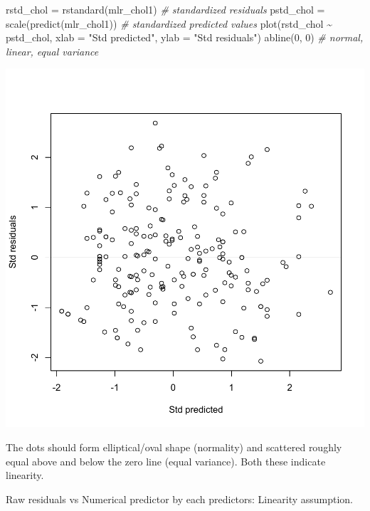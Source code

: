 \documentclass[
]{book}
\makeatletter
\newenvironment{Shaded}{\begin{snugshade}}{\end{snugshade}}
\newcommand{\AttributeTok}[1]{\textcolor[rgb]{0.61,0.61,0.61}{#1}}
\newcommand{\CommentTok}[1]{\textcolor[rgb]{0.37,0.37,0.37}{\textit{#1}}}
\newcommand{\DecValTok}[1]{\textcolor[rgb]{0.06,0.06,0.06}{#1}}
\newcommand{\FunctionTok}[1]{\textcolor[rgb]{0,0,0}{#1}}
\newcommand{\NormalTok}[1]{#1}
\newcommand{\OtherTok}[1]{\textcolor[rgb]{0.37,0.37,0.37}{#1}}
\newcommand{\SpecialCharTok}[1]{\textcolor[rgb]{0,0,0}{#1}}
\newcommand{\StringTok}[1]{\textcolor[rgb]{0.5,0.5,0.5}{#1}}
\newenvironment{kframe}{%
\medskip{}
\setlength{\fboxsep}{.8em}
 \def\at@end@of@kframe{}%
 \ifinner\ifhmode%
  \def\at@end@of@kframe{\end{minipage}}%
  \begin{minipage}{\columnwidth}%
 \fi\fi%
 \def\FrameCommand##1{\hskip\@totalleftmargin \hskip-\fboxsep
 \colorbox{shadecolor}{##1}\hskip-\fboxsep
     \hskip-\linewidth \hskip-\@totalleftmargin \hskip\columnwidth}%
 \MakeFramed {\advance\hsize-\width
   \@totalleftmargin\z@ \linewidth\hsize
   \@setminipage}}%
 {\par\unskip\endMakeFramed%
 \at@end@of@kframe}
\renewenvironment{Shaded}{\begin{kframe}}{\end{kframe}}
\makeatother
\begin{document}
\begin{Shaded}
\begin{Highlighting}[]
\NormalTok{rstd\_chol }\OtherTok{=} \FunctionTok{rstandard}\NormalTok{(mlr\_chol1)  }\CommentTok{\# standardized residuals}
\NormalTok{pstd\_chol }\OtherTok{=} \FunctionTok{scale}\NormalTok{(}\FunctionTok{predict}\NormalTok{(mlr\_chol1))  }\CommentTok{\# standardized predicted values}
\FunctionTok{plot}\NormalTok{(rstd\_chol }\SpecialCharTok{\textasciitilde{}}\NormalTok{ pstd\_chol, }\AttributeTok{xlab =} \StringTok{"Std predicted"}\NormalTok{, }\AttributeTok{ylab =} \StringTok{"Std residuals"}\NormalTok{)}
\FunctionTok{abline}\NormalTok{(}\DecValTok{0}\NormalTok{, }\DecValTok{0}\NormalTok{)  }\CommentTok{\# normal, linear, equal variance}
\end{Highlighting}
\end{Shaded}

\begin{center}\includegraphics[width=0.7\linewidth,keepaspectratio]{Multivariable_Data_Analysis_files/figure-latex/unnamed-chunk-119-1} \end{center}

The dots should form elliptical/oval shape (normality) and scattered roughly equal above and below the zero line (equal variance). Both these indicate linearity.

Raw residuals vs Numerical predictor by each predictors: Linearity assumption.

\begin{Shaded}
\end{Shaded}
\end{document}
